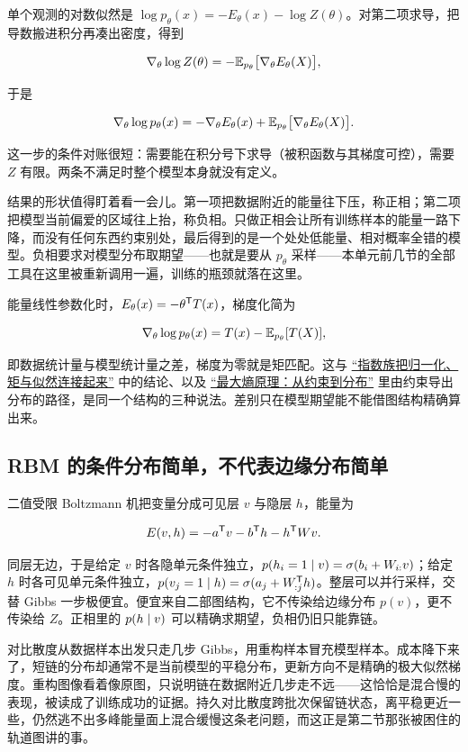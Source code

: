 单个观测的对数似然是 \(\log p_\theta(x)=-E_\theta(x)-\log Z(\theta)\)。对第二项求导，把导数搬进积分再凑出密度，得到

\[
\nabla_\theta\log Z(\theta)=-\mathbb{E}_{p_\theta}\bigl[\nabla_\theta E_\theta(X)\bigr],
\]

于是

\[
\nabla_\theta\log p_\theta(x)
=-\nabla_\theta E_\theta(x)+\mathbb{E}_{p_\theta}\bigl[\nabla_\theta E_\theta(X)\bigr].
\]

这一步的条件对账很短：需要能在积分号下求导（被积函数与其梯度可控），需要 \(Z\) 有限。两条不满足时整个模型本身就没有定义。

结果的形状值得盯着看一会儿。第一项把数据附近的能量往下压，称正相；第二项把模型当前偏爱的区域往上抬，称负相。只做正相会让所有训练样本的能量一路下降，而没有任何东西约束别处，最后得到的是一个处处低能量、相对概率全错的模型。负相要求对模型分布取期望——也就是要从 \(p_\theta\) 采样——本单元前几节的全部工具在这里被重新调用一遍，训练的瓶颈就落在这里。

能量线性参数化时，\(E_\theta(x)=-\theta^{\mathsf{T}}T(x)\)，梯度化简为

\[
\nabla_\theta\log p_\theta(x)=T(x)-\mathbb{E}_{p_\theta}[T(X)],
\]

即数据统计量与模型统计量之差，梯度为零就是矩匹配。这与 \hyperref[sec:13-Machine-Learning/06-Probabilistic-Models/06]{``指数族把归一化、矩与似然连接起来''} 中的结论、以及 \hyperref[sec:07-Information-Theory/01-Information-and-Entropy/04]{``最大熵原理：从约束到分布''} 里由约束导出分布的路径，是同一个结构的三种说法。差别只在模型期望能不能借图结构精确算出来。

\subsection{RBM 的条件分布简单，不代表边缘分布简单}

二值受限 Boltzmann 机把变量分成可见层 \(v\) 与隐层 \(h\)，能量为

\[
E(v,h)=-a^{\mathsf{T}}v-b^{\mathsf{T}}h-h^{\mathsf{T}}Wv.
\]

同层无边，于是给定 \(v\) 时各隐单元条件独立，\(p(h_i=1\mid v)=\sigma(b_i+W_{i:}v)\)；给定 \(h\) 时各可见单元条件独立，\(p(v_j=1\mid h)=\sigma(a_j+W_{:j}^{\mathsf{T}}h)\)。整层可以并行采样，交替 Gibbs 一步极便宜。便宜来自二部图结构，它不传染给边缘分布 \(p(v)\)，更不传染给 \(Z\)。正相里的 \(p(h\mid v)\) 可以精确求期望，负相仍旧只能靠链。

对比散度从数据样本出发只走几步 Gibbs，用重构样本冒充模型样本。成本降下来了，短链的分布却通常不是当前模型的平稳分布，更新方向不是精确的极大似然梯度。重构图像看着像原图，只说明链在数据附近几步走不远——这恰恰是混合慢的表现，被读成了训练成功的证据。持久对比散度跨批次保留链状态，离平稳更近一些，仍然逃不出多峰能量面上混合缓慢这条老问题，而这正是第二节那张被困住的轨道图讲的事。

